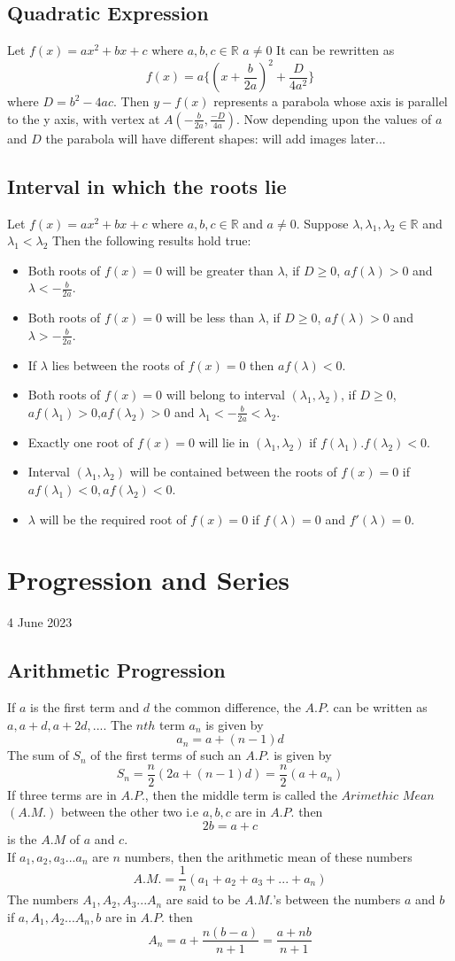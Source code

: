 \documentclass[12pt]{article}
\begin{document}
\subsection{Quadratic Expression}
Let $f(x)=ax^2+bx+c$ where $a,b,c \in \mathbb{R}$ $a \not= 0$
It can be rewritten as $$f(x)=a\{(x+ \frac{b}{2a})^2 + \frac{D}{4a^2}\}$$ where $D=b^2-4ac$. Then $y-f(x)$ represents a parabola whose axis is parallel to the y axis, with vertex at $A(-\frac{b}{2a},\frac{-D}{4a})$. Now depending upon the values of $a$ and $D$ the parabola will have different shapes:
will add images  later...
\subsection{Interval in which the roots lie}
Let $f(x)=ax^2+bx+c$ where $a,b,c \in \mathbb{R}$ and $a \not= 0$. Suppose $\lambda,\lambda _1, \lambda _2 \in \mathbb{R}$ and $\lambda_1 < \lambda_2$ Then the following results hold true:
\begin{itemize}
\item Both roots of $f(x)=0$ will be greater than $\lambda$, if $D \ge 0$, $af(\lambda)>0$ and $\lambda<-\frac{b}{2a}$.
\item Both roots of $f(x)=0$ will be less than $\lambda$, if $D \ge 0$, $af(\lambda)>0$ and $\lambda>-\frac{b}{2a}$.
\item If $\lambda$ lies between the roots of $f(x)=0$ then $af(\lambda)<0$.
\item Both roots of $f(x)=0$ will belong to interval $(\lambda_1,\lambda_2)$, if $D \ge 0$, $af(\lambda_1)>0$,$af(\lambda_2)>0$ and $\lambda_1<-\frac{b}{2a}<\lambda_2$.
\item Exactly one root of $f(x)=0$ will lie in $(\lambda_1,\lambda_2)$ if $f(\lambda_1). f(\lambda_2)<0$.
\item Interval $(\lambda_1,\lambda_2)$ will be contained between the roots of $f(x)=0$ if $af(\lambda_1)<0,af(\lambda_2)<0$.
\item $\lambda$ will be the required root of $f(x)=0$ if $f(\lambda)=0$ and $f'(\lambda)=0$.
\end{itemize}
\section{Progression and Series}
4 June 2023
\subsection{Arithmetic Progression}
If $a$ is the first term and $d$ the common difference, the $A.P.$ can be written as $a,a+d,a+2d,...$. The $nth$ term $a_n$ is given by 
$$a_n=a+(n-1)d$$ The sum of $S_n$ of the first terms of such an $A.P.$ is given by $$S_n=\frac{n}{2}(2a+(n-1)d)=\frac{n}{2}(a+a_n)$$
If three terms are in $A.P.$, then the middle term is called the $Arimethic$ $Mean$ $(A.M.)$ between the other two i.e $a,b,c$ are in $A.P.$ then $$2b=a+c$$ is the $A.M$ of $a$ and $c$.\\
If $a_1,a_2,a_3...a_n$ are $n$ numbers, then the arithmetic mean of these numbers $$A.M.=\frac{1}{n}(a_1+a_2+a_3+...+a_n)$$
The numbers $A_1,A_2,A_3...A_n$ are said to be $A.M.$'s between the numbers $a$ and $b$ if $a,A_1,A_2...A_n,b$ are in $A.P.$ then
$$A_n=a+\frac{n(b-a)}{n+1}=\frac{a+nb}{n+1}$$
\end{document}
